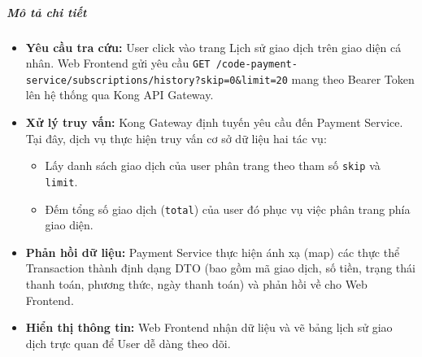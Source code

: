 \subparagraph{Mô tả chi tiết}
\begin{itemize}
\item \textbf{Yêu cầu tra cứu:} User click vào trang Lịch sử giao dịch trên giao diện cá nhân. Web Frontend gửi yêu cầu \texttt{GET /code-payment-service/subscriptions/history?skip=0\&limit=20} mang theo Bearer Token lên hệ thống qua Kong API Gateway.
\item \textbf{Xử lý truy vấn:} Kong Gateway định tuyến yêu cầu đến Payment Service. Tại đây, dịch vụ thực hiện truy vấn cơ sở dữ liệu hai tác vụ:
    \begin{itemize}
    \item Lấy danh sách giao dịch của user phân trang theo tham số \texttt{skip} và \texttt{limit}.
    \item Đếm tổng số giao dịch (\texttt{total}) của user đó phục vụ việc phân trang phía giao diện.
    \end{itemize}
\item \textbf{Phản hồi dữ liệu:} Payment Service thực hiện ánh xạ (map) các thực thể Transaction thành định dạng DTO (bao gồm mã giao dịch, số tiền, trạng thái thanh toán, phương thức, ngày thanh toán) và phản hồi về cho Web Frontend.
\item \textbf{Hiển thị thông tin:} Web Frontend nhận dữ liệu và vẽ bảng lịch sử giao dịch trực quan để User dễ dàng theo dõi.
\end{itemize}
